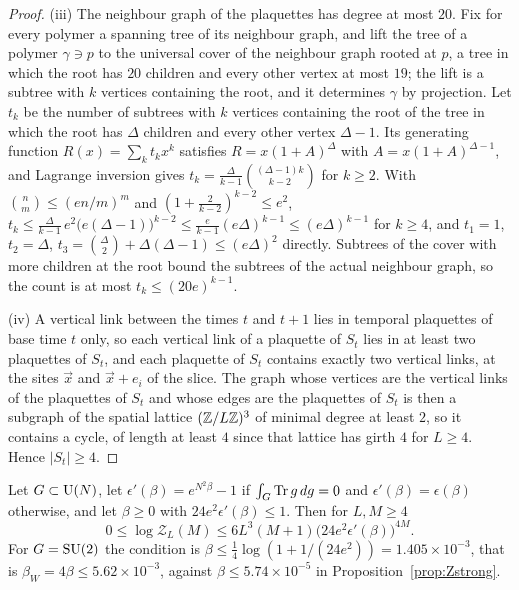 \begin{proof}
(iii) The neighbour graph of the plaquettes has degree at most $20$. Fix
for every polymer a spanning tree of its neighbour graph, and lift the tree
of a polymer $\gamma\ni p$ to the universal cover of the neighbour graph
rooted at $p$, a tree in which the root has $20$ children and every other
vertex at most $19$; the lift is a subtree with $k$ vertices containing the
root, and it determines $\gamma$ by projection. Let $t_k$ be the number of
subtrees with $k$ vertices containing the root of the tree in which the
root has $\Delta$ children and every other vertex $\Delta-1$. Its generating
function $R(x)=\sum_kt_kx^k$ satisfies $R=x(1+A)^{\Delta}$ with $A=x(1+A)^{
\Delta-1}$, and Lagrange inversion gives
$t_k=\frac{\Delta}{k-1}\binom{(\Delta-1)k}{k-2}$ for $k\ge2$. With $\binom
nm\le(en/m)^m$ and $(1+\frac2{k-2})^{k-2}\le e^2$,
$t_k\le\frac{\Delta}{k-1}\,e^2\bigl(e(\Delta-1)\bigr)^{k-2}\le
\frac{e}{k-1}(e\Delta)^{k-1}\le(e\Delta)^{k-1}$ for $k\ge4$, and $t_1=1$,
$t_2=\Delta$, $t_3=\binom{\Delta}2+\Delta(\Delta-1)\le(e\Delta)^2$
directly. Subtrees of the cover with more children at the root bound the
subtrees of the actual neighbour graph, so the count is at most $t_k\le
(20e)^{k-1}$.

(iv) A vertical link between the times $t$ and $t+1$ lies in temporal
plaquettes of base time $t$ only, so each vertical link of a plaquette of
$S_t$ lies in at least two plaquettes of $S_t$, and each plaquette of $S_t$
contains exactly two vertical links, at the sites $\vec x$ and $\vec x+e_i$
of the slice. The graph whose vertices are the vertical links of the
plaquettes of $S_t$ and whose edges are the plaquettes of $S_t$ is then a
subgraph of the spatial lattice $(\mathbb{Z}/L\mathbb{Z})^3$ of minimal degree at least
$2$, so it contains a cycle, of length at least $4$ since that lattice has
girth $4$ for $L\ge4$. Hence $|S_t|\ge4$.
\end{proof}

\begin{proposition}\label{prop:Zstrongsharp}
Let $G\subset\mathrm{U}(N)$, let $\epsilon'(\beta)=e^{N^2\beta}-1$ if $\int_G\operatorname{Tr} g\,dg
=0$ and $\epsilon'(\beta)=\epsilon(\beta)$ otherwise, and let $\beta\ge0$ with
$24e^2\epsilon'(\beta)\le1$. Then for $L,M\ge4$
\[
0\le\log\mathcal Z_L(M)\le6L^3(M+1)\bigl(24e^2\epsilon'(\beta)\bigr)^{4M}.
\]
For $G=\mathrm{SU}(2)$ the condition is $\beta\le\frac14\log(1+1/(24e^2))=1.405\times
10^{-3}$, that is $\beta_W=4\beta\le5.62\times10^{-3}$, against $\beta\le
5.74\times10^{-5}$ in Proposition~\ref{prop:Zstrong}.
\end{proposition}

